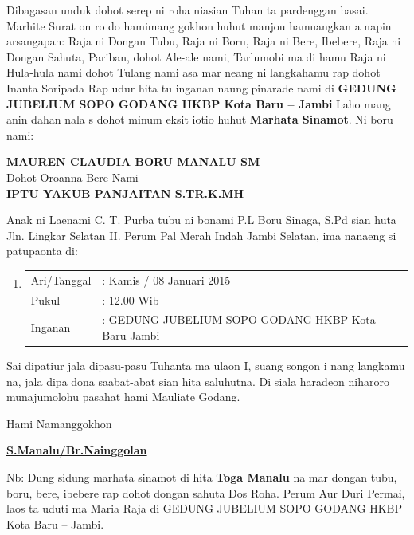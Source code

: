 \documentclass[24pt]{article}
\begin{document}
\begin{center}
{\begin{minipage}{\dimexpr\textwidth-2\fboxsep-2\fboxrule}
{\hspace{30pt}
Dibagasan unduk dohot serep ni roha niasian Tuhan ta pardenggan basai. Marhite Surat on ro do hamimang gokhon huhut manjou hamuangkan a napin arsangapan: Raja ni Dongan Tubu, Raja ni Boru, Raja ni Bere, Ibebere, Raja ni Dongan Sahuta, Pariban, dohot Ale-ale nami, Tarlumobi ma di hamu Raja ni Hula-hula nami dohot Tulang nami asa mar neang ni langkahamu rap dohot Inanta Soripada Rap udur hita tu inganan naung pinarade nami di
\textbf{GEDUNG JUBELIUM SOPO GODANG HKBP Kota Baru -- Jambi} Laho mang anin dahan nala s dohot minum eksit iotio huhut \textbf{Marhata Sinamot}. Ni boru nami:}

\begin{center}
{\Large \textbf{\MakeUppercase{Mauren Claudia Boru Manalu SM}}}
\\[0.1cm]
\Large {Dohot Oroanna Bere Nami }
\\[0.1cm]
{\Large \textbf{\MakeUppercase{Iptu Yakub Panjaitan S.Tr.K.MH}}}
\end{center}

Anak ni Laenami C. T. Purba tubu ni bonami P.L Boru Sinaga, S.Pd sian huta Jln. Lingkar Selatan II. Perum Pal Merah Indah Jambi Selatan, ima nanaeng si patupaonta di:

\begin{enumerate}[label={}]
\item\begin{tabular}{ l l }
Ari/Tanggal & :  Kamis / 08 Januari 2015 \\
Pukul & :  12.00 Wib \\
Inganan& :  GEDUNG JUBELIUM SOPO GODANG HKBP Kota Baru Jambi \\
\end{tabular}
\end{enumerate}

Sai dipatiur jala dipasu-pasu Tuhanta ma ulaon I, suang songon i nang langkamu na, jala dipa dona saabat-abat sian hita saluhutna. Di siala haradeon niharoro munajumolohu pasahat hami Mauliate Godang.

\begin{center}
    

Hami Namanggokhon

\textbf{\uline{S.Manalu/Br.Nainggolan}}


\end{center}
\small{
Nb: Dung sidung marhata sinamot di hita \textbf{Toga Manalu} na mar dongan tubu, boru, bere, ibebere rap dohot dongan sahuta Dos Roha. Perum Aur Duri Permai, laos ta uduti ma Maria Raja di GEDUNG JUBELIUM SOPO GODANG HKBP Kota Baru -- Jambi.}

\end{minipage}
}
\end{center}
\end{document}
